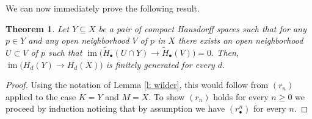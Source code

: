 \documentclass{amsart}
\newtheorem{theorem}{Theorem}
\DeclareMathOperator{\im}{im}
\begin{document}
	We can now immediately prove the following result.
	
	\begin{theorem}
		Let $Y \subseteq X$ be a pair of compact Hausdorff spaces such that for any $p \in Y$ and any open neighborhood $V$ of $p$ in $X$ there exists an open neighborhood $U \subset V$ of $p$ such that $\im \big(\widetilde H_\bullet(U \cap Y) \to \widetilde H_\bullet(V)\big) = 0$. Then, $\im \big(H_d(Y) \to H_d(X)\big)$ is finitely generated for every $d$.
	\end{theorem}

	\begin{proof}
		Using the notation of Lemma \ref{l: wilder}, this would follow from $(r_n)$ applied to the case $K = Y$ and $M = X$. To show $(r_n)$ holds for every $n \geq 0$ we proceed by induction noticing that by assumption we have $(r^n_\bullet)$ for every $n$. 
	\end{proof}
\end{document}
